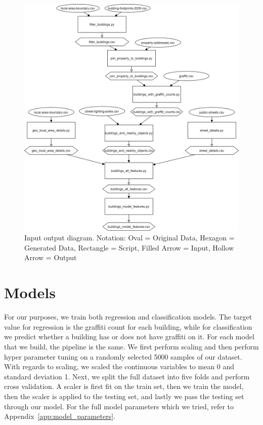 \begin{figure}
   \centering
   \includegraphics[width=\textwidth]{images/MethodologyInputOutputDiagram.png}
   \caption{Input output diagram. Notation: Oval = Original Data, Hexagon = Generated Data, Rectangle = Script, Filled Arrow = Input, Hollow Arrow = Output}
   \label{fig:methodology}
\end{figure}


\section{Models}

For our purposes, we train both regression and classification models. The target value for regression is the graffiti count for each building, while for classification we predict whether a building has or does not have graffiti on it. For each model that we build, the pipeline is the same. We first perform scaling and then perform hyper parameter tuning on a randomly selected 5000 samples of our dataset. With regards to scaling, we scaled the continuous variables to mean 0 and standard deviation 1. Next, we split the full dataset into five folds and perform cross validation. A scaler is first fit on the train set, then we train the model, then the scaler is applied to the testing set, and lastly we pass the testing set through our model. For the full model parameters which we tried, refer to Appendix~\ref{app:model_parameters}.

